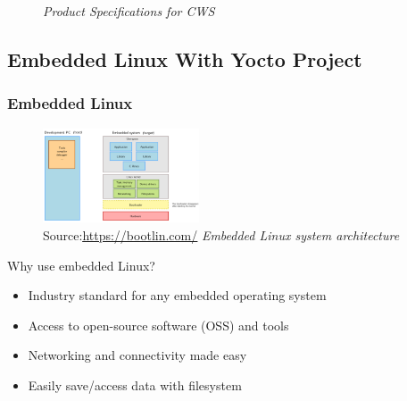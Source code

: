 \documentclass[8pt,compress]{beamer}
\begin{document}
\begin{frame}
\begin{minipage}{0.50\textwidth}
\begin{figure}
            \caption{\it Product Specifications for CWS}
        \end{figure}
        \vspace{0.2cm}
    \end{minipage}
\end{frame}
\subsection{Embedded Linux With Yocto Project}


\begin{frame}
  \frametitle{}
\end{frame}

\begin{frame}
  \frametitle{Embedded Linux}
  \begin{figure}
    \includegraphics[width=175px]{assets/diagrams/embedded_linux.png}
    \centering
    \caption{\tiny Source:\underline{\href{https://bootlin.com/}{https://bootlin.com/}}\hspace{\textwidth}
    \textit{Embedded Linux system architecture}}
  \end{figure}
  \vspace{-16px}
  \begin{block}{Why use embedded Linux?}
    \small{
      \begin{itemize}
        \item Industry standard for any embedded operating system
        \item Access to open-source software (OSS) and tools
        \item Networking and connectivity made easy 
        \item Easily save/access data with filesystem
      \end{itemize}
    }
  \end{block}
\end{frame}
\end{document}
